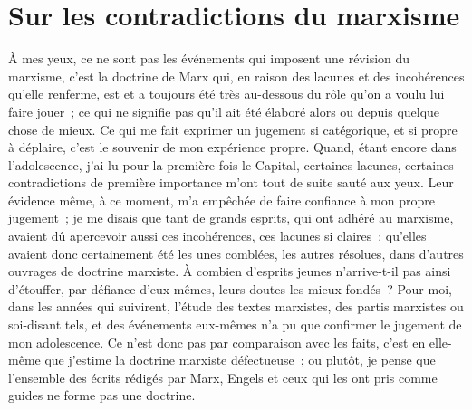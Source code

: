 \documentclass[french,twoside]{book} %
\begin{document}
\begin{center}
\end{center}
\section[Sur les contradictions du marxisme]{Sur les contradictions du marxisme}\renewcommand{\leftmark}{Sur les contradictions du marxisme}

\noindent \par
À mes yeux, ce ne sont pas les événements qui imposent une révision du marxisme, c'est la doctrine de Marx qui, en raison des lacunes et des incohérences qu'elle renferme, est et a toujours été très au-dessous du rôle qu'on a voulu lui faire jouer ; ce qui ne signifie pas qu'il ait été élaboré alors ou depuis quelque chose de mieux. Ce qui me fait exprimer un jugement si catégorique, et si propre à déplaire, c'est le souvenir de mon expérience propre. Quand, étant encore dans l'adolescence, j'ai lu pour la première fois le Capital, certaines lacunes, certaines contradictions de première importance m'ont tout de suite sauté aux yeux. Leur évidence même, à ce moment, m'a empêchée de faire confiance à mon propre jugement ; je me disais que tant de grands esprits, qui ont adhéré au marxisme, avaient dû apercevoir aussi ces incohérences, ces lacunes si claires ; qu'elles avaient donc certainement été les unes comblées, les autres résolues, dans d'autres ouvrages de doctrine marxiste. À combien d'esprits jeunes n'arrive-t-il pas ainsi d'étouffer, par défiance d'eux-mêmes, leurs doutes les mieux fondés ? Pour moi, dans les années qui suivirent, l'étude des textes marxistes, des partis marxistes ou soi-disant tels, et des événements eux-mêmes n'a pu que confirmer le jugement de mon adolescence. Ce n'est donc pas par comparaison avec les faits, c'est en elle-même que j'estime la doctrine marxiste défectueuse ; ou plutôt, je pense que l'ensemble des écrits rédigés par Marx, Engels et ceux qui les ont pris comme guides ne forme pas une doctrine.\par
\end{document}
